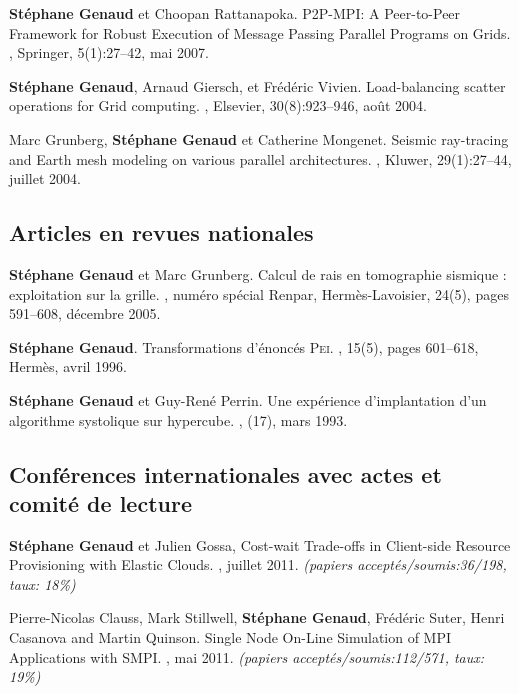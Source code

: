 \documentclass[11pt]{article}
\begin{document}
\begin{thebibliography}{99}
\textbf{Stéphane Genaud} et Choopan Rattanapoka.
\newblock P2P-MPI: A Peer-to-Peer Framework for Robust Execution of Message Passing Parallel Programs on Grids.
, Springer, 5(1):27--42, mai 2007.


\textbf{Stéphane Genaud}, Arnaud Giersch, et Frédéric Vivien.
\newblock Load-balancing scatter operations for Grid computing.
, Elsevier, 30(8):923--946, août 2004.

Marc Grunberg, \textbf{Stéphane Genaud} et Catherine Mongenet.
\newblock Seismic ray-tracing and Earth mesh modeling on various parallel
  architectures.
, Kluwer, 29(1):27--44, juillet 2004.


\subsection*{Articles en revues nationales}
\textbf{Stéphane Genaud} et Marc Grunberg. 
\newblock  Calcul de rais en tomographie sismique : exploitation sur la grille.
, numéro spécial Renpar, 
Hermès-Lavoisier, 24(5), pages 591--608, décembre 2005.

\textbf{Stéphane Genaud}.
\newblock Transformations d'énoncés \textsc{Pei}.
, 15(5), pages 601--618, 
Hermès, avril 1996.

\textbf{Stéphane Genaud} et Guy-René Perrin.
\newblock Une expérience d'implantation d'un algorithme systolique sur
  hypercube.
,
  (17), mars 1993.


\subsection*{Conférences internationales avec actes et comité de lecture}

\newblock \textbf{Stéphane Genaud} et Julien Gossa,
\newblock Cost-wait Trade-offs in Client-side Resource Provisioning with 
Elastic Clouds.
, juillet 2011.
\newblock \small{\textit{(papiers acceptés/soumis{:}36/198, taux: 18\%)}}


\newblock Pierre-Nicolas Clauss, Mark Stillwell, \textbf{Stéphane Genaud}, 
Fr\'ed\'eric Suter, Henri Casanova and  Martin Quinson.
\newblock Single Node On-Line Simulation of MPI Applications with SMPI.
, mai 2011.
\newblock \small{\textit{(papiers acceptés/soumis{:}112/571, taux: 19\%)}}


\end{thebibliography}
\end{document}
